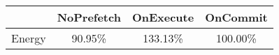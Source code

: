 \begin{tabular}{ l|ccc }
 & NoPrefetch & OnExecute & OnCommit\\ \hline
Energy
 & 90.95\% & 133.13\% & 100.00\%\\ \hline
\end{tabular}

